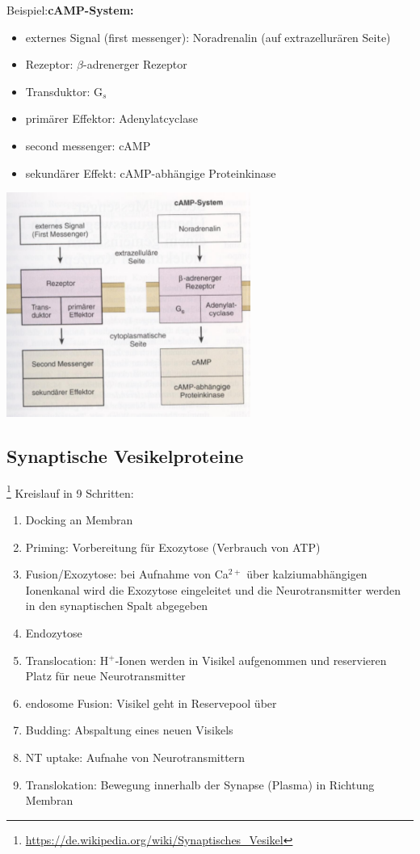 Beispiel:\textbf{cAMP-System:}
\begin{itemize}
	\item externes Signal (first messenger): Noradrenalin (auf extrazellurären Seite)
	\item Rezeptor: $\beta$-adrenerger Rezeptor
	\item Transduktor: G$_s$
	\item primärer Effektor: Adenylatcyclase
	\item second messenger: cAMP
	\item sekundärer Effekt: cAMP-abhängige Proteinkinase
\end{itemize}
\includegraphics[width=0.6\textwidth]{lectures/160601/pix/1.png}

\subsection{Synaptische Vesikelproteine}\footnote{\url{https://de.wikipedia.org/wiki/Synaptisches_Vesikel}}
Kreislauf in 9 Schritten:
\begin{enumerate}
	\item Docking an Membran
	\item Priming: Vorbereitung für Exozytose (Verbrauch von ATP)
	\item Fusion/Exozytose: bei Aufnahme von Ca$^{2+}$ über kalziumabhängigen Ionenkanal wird die Exozytose eingeleitet und die Neurotransmitter werden in den synaptischen Spalt abgegeben
	\item Endozytose
	\item Translocation: H$^+$-Ionen werden in Visikel aufgenommen und reservieren Platz für neue Neurotransmitter
	\item endosome Fusion: Visikel geht in Reservepool über
	\item Budding: Abspaltung eines neuen Visikels
	\item NT uptake: Aufnahe von Neurotransmittern
	\item Translokation: Bewegung innerhalb der Synapse (Plasma) in Richtung Membran
\end{enumerate}